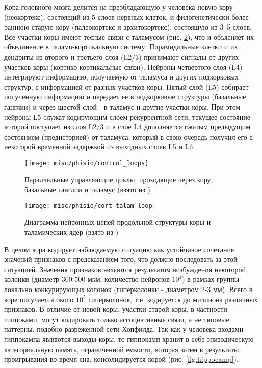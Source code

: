 \documentclass[12pt]{report}
\begin{document}
	Кора головного мозга делится на преобладающую у человека новую кору (неокортекс), состоящий из 5 слоев нервных клеток, и филогенетически более раннюю старую кору (палеокортекс и архитокортекс), состоящую из 3--5 слоев. Все участки коры имеют тесные связи с таламусом \cite{Izhikevich2008} (рис. \ref{fig:cotr_talam}), что и объясняет их объединение в таламо-кортикальную систему. Пирамидальные клетки и их дендриты из второго и третьего слоя (L2/3) принимают сигналы от других участков коры (кортико-кортикальные связи). Нейроны четвертого слоя (L4) интегрируют информацию, получаемую от таламуса и других подкорковых структур, с информацией от разных участков коры. Пятый слой (L5) собирает полученную информацию и передает ее в подкорковые структуры (базальные ганглии) и через шестой слой - в таламус и другие участки коры. При этом нейроны L5 служат кодирующим слоем рекуррентной сети, текущее состояние которой поступает из слоя L2/3 и в слое L4 дополняется сжатым предыдущим состоянием (предисторией) от таламуса, который в свою очередь получил его с некоторой временной задержкой из выходных слоев L5 и L6.
	
	\begin{figure}
		\centering
		\texttt{[image: misc/phisio/control\_loops]}
		\caption{Параллельные управляющие циклы, проходящие через кору, базальные ганглии и таламус (взято из \cite{Kringelbach2007})}
		\label{fig:control}		
	\end{figure}

	\begin{figure}
		\centering
		\texttt{[image: misc/phisio/cort-talam\_loop]}
		\caption{Диаграмма нейронных цепей продольной структуры коры и таламических ядер (взято из \cite{Izhikevich2008})}
		\label{fig:cotr_talam}		
	\end{figure}

	В целом кора кодирует наблюдаемую ситуацию как устойчивое сочетание значений признаков с предсказанием того, что должно последовать за этой ситуацией. Значения признаков являются результатом возбуждения некоторой колонки (диаметр 300-500 мкм, количество нейронов $10^4$) в рамках группы локально конкурирующих колонок (гиперколонки - диаметром 2-3 мм). Всего в коре получается около $10^5$ гиперколонок, т.е. кодируется до миллиона различных признаков. В отличие от новой коры, участки старой коры, в частности гиппокамп, могут кодировать только ассоциативные связи, а не типовые паттерны, подобно разреженной сети Хопфилда. Так как у человека входами гиппокампа являются выходы коры, то гиппокамп хранит в себе эпизодическую категориальную память, ограниченной емкости, которая затем в результаты проигрывания во время сна, консолидируется корой (рис. \ref{fig:hippocamp}).
	
\end{document}
